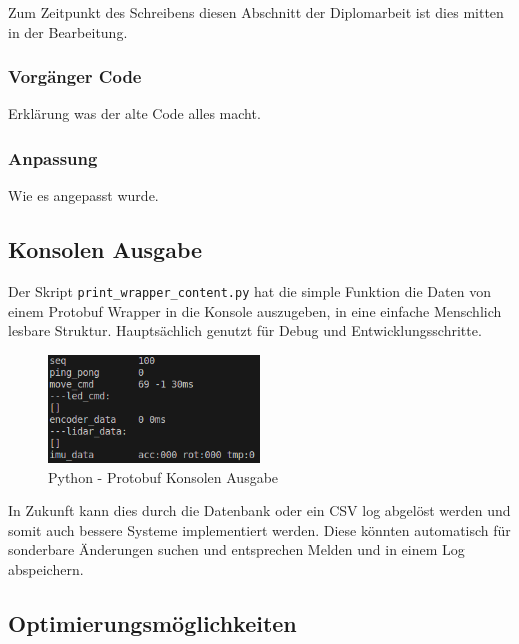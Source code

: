 Zum Zeitpunkt des Schreibens diesen Abschnitt der Diplomarbeit 
ist dies mitten in der Bearbeitung.
\subsubsection{Vorgänger Code}
Erklärung was der alte Code alles macht.
\subsubsection{Anpassung}
Wie es angepasst wurde.

\subsection{Konsolen Ausgabe}
Der Skript \texttt{print\_wrapper\_content.py} hat die simple Funktion 
die Daten von einem Protobuf Wrapper in die Konsole auszugeben, 
in eine einfache Menschlich lesbare Struktur. 
Hauptsächlich genutzt für Debug und Entwicklungsschritte.

\begin{figure}[H]
    \includegraphics[width=0.5\textwidth, center]{img/Backend/print_wrapper_all.png}
    \caption{Python - Protobuf Konsolen Ausgabe}
    \label{fig:py_konsole_o}
\end{figure}

In Zukunft kann dies durch die Datenbank oder ein CSV log abgelöst werden 
und somit auch bessere Systeme implementiert werden.
% 
Diese könnten automatisch für sonderbare Änderungen suchen 
und entsprechen Melden und in einem Log abspeichern.

\subsection{Optimierungsmöglichkeiten}
\label{subsec:Optimierungsmöglichkeiten}

